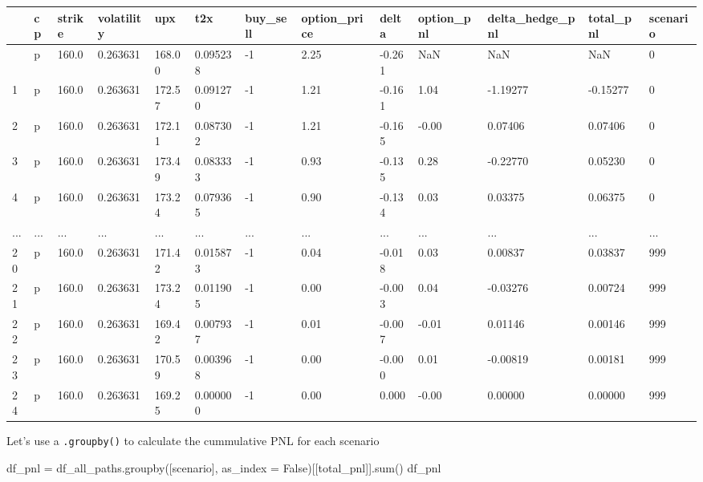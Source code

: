 \documentclass[
  letterpaper,
  DIV=11,
  numbers=noendperiod]{scrreprt}
\newenvironment{Shaded}{\begin{snugshade}}{\end{snugshade}}
\newcommand{\BuiltInTok}[1]{\textcolor[rgb]{0.00,0.23,0.31}{#1}}
\newcommand{\NormalTok}[1]{\textcolor[rgb]{0.00,0.23,0.31}{#1}}
\newcommand{\OperatorTok}[1]{\textcolor[rgb]{0.37,0.37,0.37}{#1}}
\newcommand{\StringTok}[1]{\textcolor[rgb]{0.13,0.47,0.30}{#1}}
\newcommand{\VariableTok}[1]{\textcolor[rgb]{0.07,0.07,0.07}{#1}}
\begin{document}
\begin{longtable}[]{@{}lllllllllllll@{}}
\toprule\noalign{}
& cp & strike & volatility & upx & t2x & buy\_sell & option\_price &
delta & option\_pnl & delta\_hedge\_pnl & total\_pnl & scenario \\
\midrule\noalign{}
\endhead
\bottomrule\noalign{}
\endlastfoot
0 & p & 160.0 & 0.263631 & 168.00 & 0.095238 & -1 & 2.25 & -0.261 & NaN
& NaN & NaN & 0 \\
1 & p & 160.0 & 0.263631 & 172.57 & 0.091270 & -1 & 1.21 & -0.161 & 1.04
& -1.19277 & -0.15277 & 0 \\
2 & p & 160.0 & 0.263631 & 172.11 & 0.087302 & -1 & 1.21 & -0.165 &
-0.00 & 0.07406 & 0.07406 & 0 \\
3 & p & 160.0 & 0.263631 & 173.49 & 0.083333 & -1 & 0.93 & -0.135 & 0.28
& -0.22770 & 0.05230 & 0 \\
4 & p & 160.0 & 0.263631 & 173.24 & 0.079365 & -1 & 0.90 & -0.134 & 0.03
& 0.03375 & 0.06375 & 0 \\
... & ... & ... & ... & ... & ... & ... & ... & ... & ... & ... & ... &
... \\
20 & p & 160.0 & 0.263631 & 171.42 & 0.015873 & -1 & 0.04 & -0.018 &
0.03 & 0.00837 & 0.03837 & 999 \\
21 & p & 160.0 & 0.263631 & 173.24 & 0.011905 & -1 & 0.00 & -0.003 &
0.04 & -0.03276 & 0.00724 & 999 \\
22 & p & 160.0 & 0.263631 & 169.42 & 0.007937 & -1 & 0.01 & -0.007 &
-0.01 & 0.01146 & 0.00146 & 999 \\
23 & p & 160.0 & 0.263631 & 170.59 & 0.003968 & -1 & 0.00 & -0.000 &
0.01 & -0.00819 & 0.00181 & 999 \\
24 & p & 160.0 & 0.263631 & 169.25 & 0.000000 & -1 & 0.00 & 0.000 &
-0.00 & 0.00000 & 0.00000 & 999 \\
\end{longtable}

Let's use a \texttt{.groupby()} to calculate the cummulative PNL for
each scenario

\begin{Shaded}
\begin{Highlighting}[]
\NormalTok{df\_pnl }\OperatorTok{=}\NormalTok{ df\_all\_paths.groupby([}\StringTok{\textquotesingle{}scenario\textquotesingle{}}\NormalTok{], as\_index }\OperatorTok{=} \VariableTok{False}\NormalTok{)[[}\StringTok{\textquotesingle{}total\_pnl\textquotesingle{}}\NormalTok{]].}\BuiltInTok{sum}\NormalTok{()}
\NormalTok{df\_pnl}
\end{Highlighting}
\end{Shaded}
\end{document}
